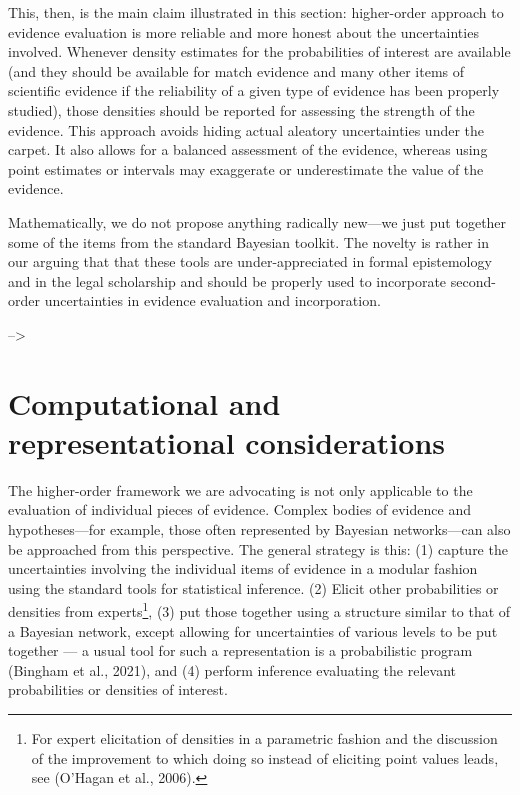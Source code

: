 \documentclass[
  10pt,
  dvipsnames,enabledeprecatedfontcommands]{scrartcl}
\begin{document}
This, then, is the main claim illustrated in this section: higher-order
approach to evidence evaluation is more reliable and more honest about
the uncertainties involved. Whenever density estimates for the
probabilities of interest are available (and they should be available
for match evidence and many other items of scientific evidence if the
reliability of a given type of evidence has been properly studied),
those densities should be reported for assessing the strength of the
evidence. This approach avoids hiding actual aleatory uncertainties
under the carpet. It also allows for a balanced assessment of the
evidence, whereas using point estimates or intervals may exaggerate or
underestimate the value of the evidence.

Mathematically, we do not propose anything radically new---we just put
together some of the items from the standard Bayesian toolkit. The
novelty is rather in our arguing that that these tools are
under-appreciated in formal epistemology and in the legal scholarship
and should be properly used to incorporate second-order uncertainties in
evidence evaluation and incorporation.

--\textgreater{}

\hypertarget{computational-and-representational-considerations}{%
\section{Computational and representational
considerations}\label{computational-and-representational-considerations}}

The higher-order framework we are advocating is not only applicable to
the evaluation of individual pieces of evidence. Complex bodies of
evidence and hypotheses---for example, those often represented by
Bayesian networks---can also be approached from this perspective. The
general strategy is this: (1) capture the uncertainties involving the
individual items of evidence in a modular fashion using the standard
tools for statistical inference. (2) Elicit other probabilities or
densities from experts\footnote{For expert elicitation of densities in a
  parametric fashion and the discussion of the improvement to which
  doing so instead of eliciting point values leads, see (O'Hagan et al.,
  2006).}, (3) put those together using a structure similar to that of a
Bayesian network, except allowing for uncertainties of various levels to
be put together --- a usual tool for such a representation is a
probabilistic program (Bingham et al., 2021), and (4) perform inference
evaluating the relevant probabilities or densities of interest.
\end{document}
